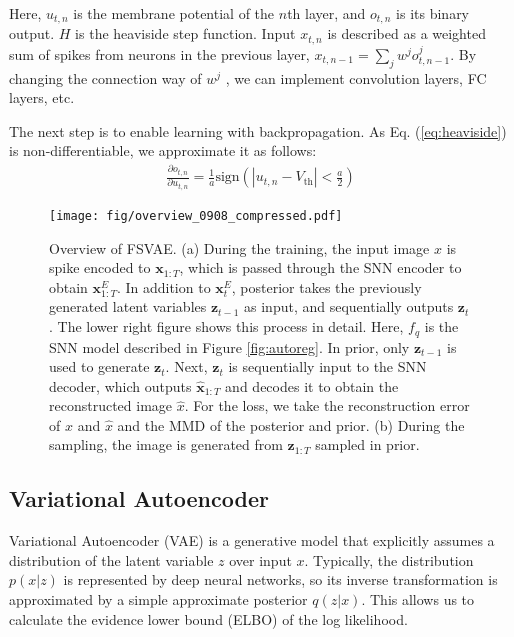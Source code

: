 \documentclass[letterpaper]{article} %
\begin{document}
Here, $u_{t,n}$ is the membrane potential of the $n$th layer, and $o_{t,n}$ is its binary output. $H$ is the heaviside step function. Input $x_{t,n}$ is described as a weighted sum of spikes from neurons in the previous layer,  $x_{t,n-1}=\sum_j w^j o_{t,n-1}^j$. By changing the connection way of $w^j$ , we can implement convolution layers, FC layers, etc.

The next step is to enable learning with backpropagation. As Eq. (\ref{eq:heaviside}) is non-differentiable, we approximate it as follows:
\begin{align}
    \frac{\partial o_{t,n}}{\partial u_{t,n}} = \frac{1}{a} \mathrm{sign}\left(|u_{t,n} - V_{\mathrm{th}}|< \frac{a}{2}\right)
\end{align}

\begin{figure*}[t]
 \begin{center}
  \texttt{[image: fig/overview\_0908\_compressed.pdf]}
  \caption{Overview of FSVAE. (a) During the training, the input image $x$ is spike encoded to $\bm{x}_{1:T}$, which is passed through the SNN encoder to obtain $\bm {x}_{1:T}^E$.
  In addition to $\bm{x}_{t}^E$, posterior takes the previously generated latent variables $\bm{z}_{t-1}$ as input, and sequentially outputs $\bm{z}_t$. The lower right figure shows this process in detail. Here, $f_q$ is the SNN model described in Figure \ref{fig:autoreg}.
  In prior, only $\bm{z}_{t-1}$ is used to generate $\bm{z}_t$.
  Next, $\bm{z}_t$ is sequentially input to the SNN decoder, which outputs $\hat{\bm{x}}_{1:T}$ and decodes it to obtain the reconstructed image $\hat{x}$. For the loss, we take the reconstruction error of $x$ and $\hat{x}$ and the MMD of the posterior and prior. (b) During the sampling, the image is generated from $\bm{z}_{1:T}$ sampled in prior.}
  \label{fig:overview}
 \end{center}
\end{figure*}

\subsection{Variational Autoencoder}
Variational Autoencoder (VAE) \cite{vae} is a generative model that explicitly assumes a distribution of the latent variable $z$ over input $x$. Typically, the distribution $p(x|z)$ is represented by deep neural networks, so its inverse transformation is approximated by a simple approximate posterior $q(z|x)$. This allows us to calculate the evidence lower bound (ELBO) of the log likelihood.
\end{document}
